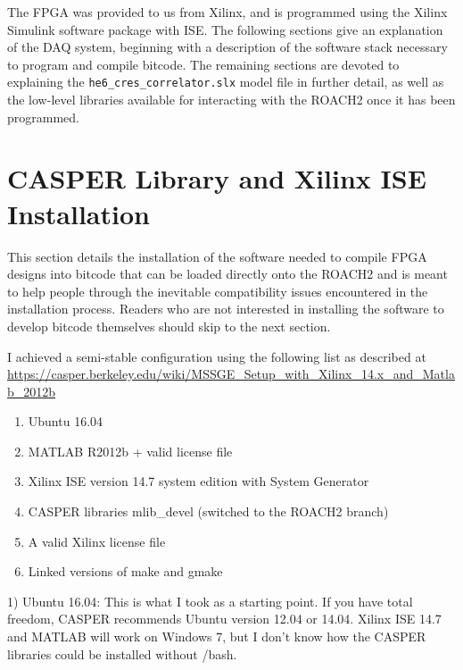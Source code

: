 \documentclass[a4paper,10pt]{article}
\begin{document}
The FPGA was provided to us from Xilinx, and is programmed using the Xilinx Simulink software package with ISE. The following sections give an explanation of the DAQ system, beginning with a description of the software stack necessary to program and compile bitcode. The remaining sections are devoted to explaining the  \texttt{he6\_cres\_correlator.slx} model file in further detail, as well as the low-level libraries available for interacting with the ROACH2 once it has been programmed.

\section{CASPER Library and Xilinx ISE Installation}
This section details the installation of the software needed to compile FPGA designs into bitcode that can be loaded directly onto the ROACH2 and is meant to help people through the inevitable compatibility issues encountered in the installation process. Readers who are not interested in installing the software to develop bitcode themselves should skip to the next section. 
\vspace{4mm}

I achieved a semi-stable configuration using the following list as described at
\href{https://casper.berkeley.edu/wiki/MSSGE\_Setup\_with\_Xilinx\_14.x\_and\_Matlab\_2012b}{https://casper.berkeley.edu/wiki/MSSGE\_Setup\_with\_Xilinx\_14.x\_and\_Matlab\_2012b}

\begin{enumerate}
\item Ubuntu 16.04
\item MATLAB R2012b + valid license file
\item Xilinx ISE version 14.7 system edition with System Generator
\item CASPER libraries mlib\_devel (switched to the ROACH2 branch)
\item A valid Xilinx license file
\item Linked versions of make and gmake
\end{enumerate}
\vspace{1mm} 

\hangindent=1.0cm 1) Ubuntu 16.04: This is what I took as a starting point. If you have total freedom, CASPER recommends Ubuntu version 12.04 or 14.04. Xilinx ISE 14.7 and MATLAB will work on Windows 7, but I don’t know how the CASPER libraries could be installed without /bash.
\vspace{3mm} 
\end{document}

